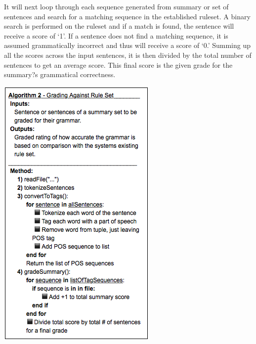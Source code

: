 \documentclass[11pt,a4paper]{article}
\newenvironment{Figure}
  {\par\medskip\noindent\minipage{\linewidth}}
  {\endminipage\par\medskip}
\begin{document}
\begin{multicols}{2}
It will next loop through each sequence generated from summary or set of sentences and search for a matching sequence in the established ruleset. A binary search is performed on the ruleset and if a match is found, the sentence will receive a score of `1'. If a sentence does not find a matching sequence, it is assumed grammatically incorrect and thus will receive a score of `0.' Summing up all the scores across the input sentences, it is then divided by the total number of sentences to get an average score. This final score is the given grade for the summary?s grammatical correctness.

\begin{Figure}  
   \centering
   \includegraphics[width=\linewidth]{GradeAlgorithm}
\end{Figure}   


\end{multicols}
\end{document}
